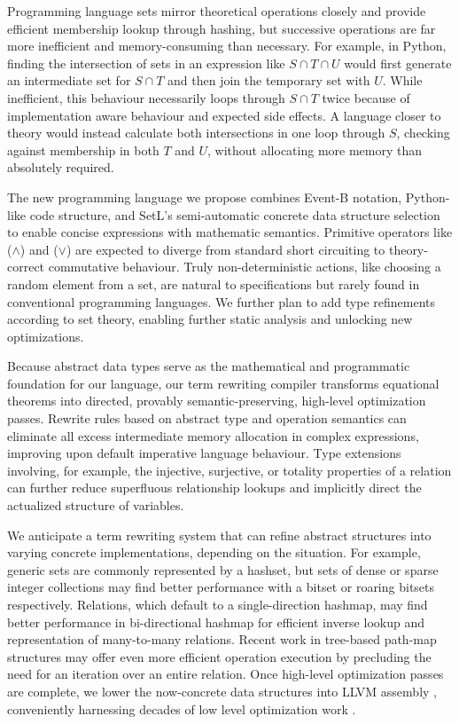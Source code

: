 \documentclass[12pt]{article}
\begin{document}
Programming language sets mirror theoretical operations closely and provide efficient membership lookup through hashing, but successive operations are far more inefficient and memory-consuming than necessary. For example, in Python, finding the intersection of sets in an expression like $S \cap T \cap U$ would first generate an intermediate set for $S \cap T$ and then join the temporary set with $U$. While inefficient, this behaviour necessarily loops through $S \cap T$ twice because of implementation aware behaviour and expected side effects. A language closer to theory would instead calculate both intersections in one loop through $S$, checking against membership in both $T$ and $U$, without allocating more memory than absolutely required.

The new programming language we propose combines Event-B notation, Python-like code structure, and SetL's semi-automatic concrete data structure selection to enable concise expressions with mathematic semantics. Primitive operators like ($\land$) and ($\lor$) are expected to diverge from standard short circuiting to theory-correct commutative behaviour. Truly non-deterministic actions, like choosing a random element from a set, are natural to specifications but rarely found in conventional programming languages. We further plan to add type refinements according to set theory, enabling further static analysis and unlocking new optimizations.

Because abstract data types serve as the mathematical and programmatic foundation for our language, our term rewriting compiler transforms equational theorems into directed, provably semantic-preserving, high-level optimization passes. Rewrite rules based on abstract type and operation semantics can eliminate all excess intermediate memory allocation in complex expressions, improving upon default imperative language behaviour. Type extensions involving, for example, the injective, surjective, or totality properties of a relation can further reduce superfluous relationship lookups and implicitly direct the actualized structure of variables.

We anticipate a term rewriting system that can refine abstract structures into varying concrete implementations, depending on the situation. For example, generic sets are commonly represented by a hashset, but sets of dense or sparse integer collections may find better performance with a bitset or roaring bitsets respectively. Relations, which default to a single-direction hashmap, may find better performance in bi-directional hashmap for efficient inverse lookup and representation of many-to-many relations. Recent work in tree-based path-map structures \cite{TODO} may offer even more efficient operation execution by precluding the need for an iteration over an entire relation. Once high-level optimization passes are complete, we lower the now-concrete data structures into LLVM assembly \cite{TODO}, conveniently harnessing decades of low level optimization work \cite{TODO}.
\end{document}
